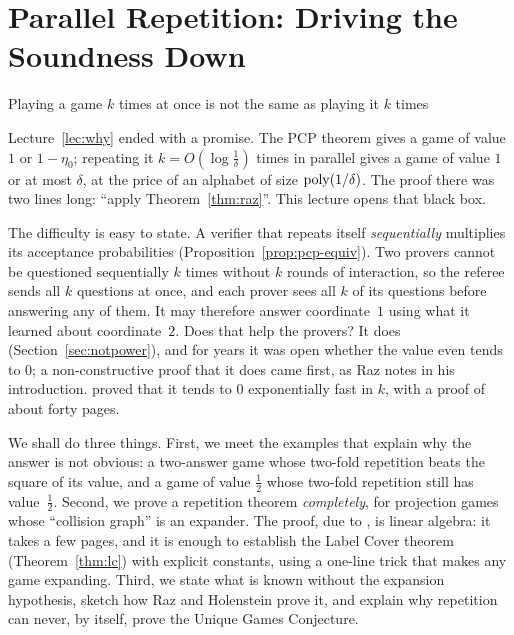 \chapter{Parallel Repetition: Driving the Soundness Down}
\label{lec:raz}

{\sffamily\large\color{softgray}Playing a game $k$ times at once is not the same as playing it $k$ times\par}
\vspace{0.5em}

\providecommand{\lamp}{\lambda_{+}}

\noindent
Lecture~\ref{lec:why} ended with a promise.  The PCP theorem gives a game of value $1$ or $1-\eta_0$; repeating it $k=O(\log\frac1\delta)$ times in parallel gives a game of value $1$ or at most $\delta$,
at the price of an alphabet of size $\operatorname{poly}(1/\delta)$.  The proof there was two lines long: ``apply Theorem~\ref{thm:raz}''.  This lecture opens that black box.

The difficulty is easy to state.  A verifier that repeats itself \emph{sequentially} multiplies its acceptance probabilities (Proposition~\ref{prop:pcp-equiv}).
Two provers cannot be questioned sequentially $k$ times without $k$ rounds of interaction, so the referee sends all $k$ questions at once, and each prover sees all $k$ of its questions before answering any of them.
It may therefore answer coordinate~$1$ using what it learned about coordinate~$2$.  Does that help the provers?  It does (Section~\ref{sec:notpower}), and for years it was open whether the value even tends to $0$; a non-constructive proof that it does came first, as Raz notes in his introduction.
\citet{Raz98} proved that it tends to $0$ exponentially fast in $k$, with a proof of about forty pages.

We shall do three things.  First, we meet the examples that explain why the answer is not obvious: a two-answer game whose two-fold repetition beats the square of its value, and a game of value $\frac12$ whose two-fold repetition still has value~$\frac12$.
Second, we prove a repetition theorem \emph{completely}, for projection games whose ``collision graph'' is an expander.  The proof, due to \citet{DinurSteurer14}, is linear algebra: it takes a few pages, and it is enough to establish the Label Cover theorem
(Theorem~\ref{thm:lc}) with explicit constants, using a one-line trick that makes any game expanding.  Third, we state what is known without the expansion hypothesis, sketch how Raz and Holenstein prove it, and explain why repetition can never,
by itself, prove the Unique Games Conjecture.

